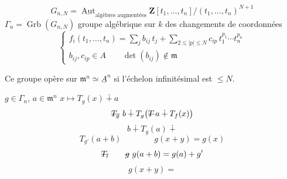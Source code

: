 \documentclass[11pt,a4paper]{article}
\begin{document}
\[
  G_{n,N} = \underline{\operatorname{Aut}}_{\text{algèbres augmentées}} \mathbf{Z}[t_1, \ldots, t_n]/(t_1, \ldots, t_n)^{N+1}
\]
$\Gamma_n = \operatorname{Grb}(G_{n,N})$ groupe algébrique sur $k$ des changements de coordonnées
\[
  \begin{cases}
    f_i(t_1, \ldots, t_n) = \displaystyle\sum_j b_{ij}\, t_j + \sum_{2 \leq |p| \leq N} c_{ip}\, t_1^{p_1} \cdots t_n^{p_n} \\
    b_{ij}, c_{ip} \in A \qquad \det(b_{ij}) \notin \mathfrak{m}
  \end{cases}
\]

Ce groupe opère sur $\mathfrak{m}^n \simeq \underline{A}^n$ si l'échelon infinitésimal est $\leq N$. 

$g \in \Gamma_n$, $a \in \mathfrak{m}^n$ \qquad $x \mapsto T_g(x) \dotplus a$
\[
  \text{\struck{$T_g$}}\ b \dotplus T_g\bigl(\text{\struck{$T$}}\, a \dotplus T_f(x)\bigr)
\]
\[
  b \dotplus T_g(a) \dotplus
\]
\[
  T_{g'}(a + b) \qquad\qquad g(x + y) = g(x)
\]
\[
  \text{\struck{$T_i$}} \qquad \text{\struck{$g$}}\ g(a + b) = g(a) + g'
\]
\[
  g(x + y) =
\]
\end{document}

